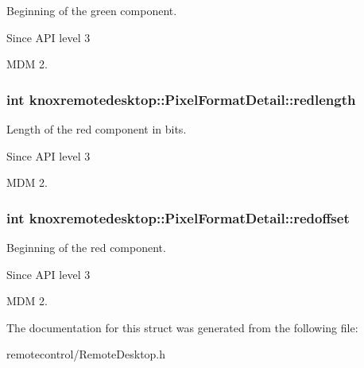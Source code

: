 \-Beginning of the green component. 

\begin{DoxySince}{\-Since}
\-A\-P\-I level 3

\-M\-D\-M 2. 
\end{DoxySince}
\hypertarget{structknoxremotedesktop_1_1PixelFormatDetail_a370e9d8250b35b1f717a71a3737c73d5}{
\subsubsection[{redlength}]{\setlength{\rightskip}{0pt plus 5cm}int {\bf knoxremotedesktop\-::\-Pixel\-Format\-Detail\-::redlength}}}\label{structknoxremotedesktop_1_1PixelFormatDetail_a370e9d8250b35b1f717a71a3737c73d5}


\-Length of the red component in bits. 

\begin{DoxySince}{\-Since}
\-A\-P\-I level 3

\-M\-D\-M 2. 
\end{DoxySince}
\hypertarget{structknoxremotedesktop_1_1PixelFormatDetail_a5c1e26d5565b29732f007ab2f4c89357}{
\subsubsection[{redoffset}]{\setlength{\rightskip}{0pt plus 5cm}int {\bf knoxremotedesktop\-::\-Pixel\-Format\-Detail\-::redoffset}}}\label{structknoxremotedesktop_1_1PixelFormatDetail_a5c1e26d5565b29732f007ab2f4c89357}


\-Beginning of the red component. 

\begin{DoxySince}{\-Since}
\-A\-P\-I level 3

\-M\-D\-M 2. 
\end{DoxySince}


\-The documentation for this struct was generated from the following file\-:\begin{DoxyCompactItemize}
\item 
remotecontrol/\-Remote\-Desktop.\-h\end{DoxyCompactItemize}
